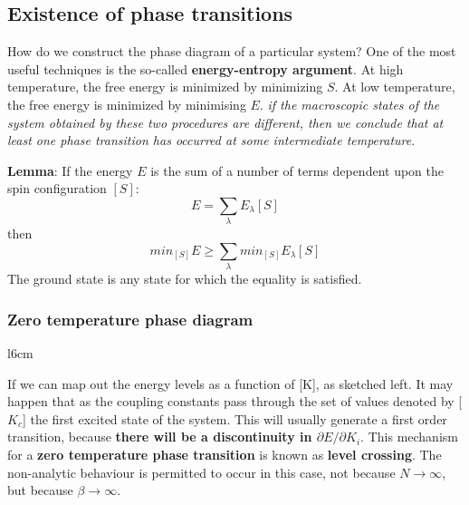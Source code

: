 \documentclass[12pt,titlepage]{article}
\numberwithin{equation}{section}
\begin{document}
\subsection{Existence of phase transitions}
How do we construct the phase diagram of a particular system? One of the most useful techniques is the so-called \textbf{energy-entropy argument}. At high temperature, the free energy is minimized by minimizing $S$. At low temperature, the free energy is minimized by minimising $E$. \textit{if the macroscopic states of the system obtained by these two procedures are different, then we conclude that at least one phase transition has occurred at some intermediate temperature}.

\textbf{Lemma}: If the energy $E$ is the sum of a number of terms dependent upon the spin configuration $[S]$:
\begin{equation}
    E=\sum_{\lambda}E_{\lambda}[S]
\end{equation}
then
\begin{equation}
    min_{[S]}E\geqslant\sum_{\lambda}min_{[S]}E_{\lambda}[S]
\end{equation}
The ground state is any state for which the equality is satisfied.
\subsubsection{Zero temperature phase diagram}
\begin{wrapfigure}{l}{6cm}
\end{wrapfigure}
If we can map out the energy levels as a function of [K], as sketched left. It may happen that as the coupling constants pass through the set of values denoted by [$K_c$] the first excited state of the system. This will usually generate a first order transition, because \textbf{there will be a discontinuity in $\partial E/\partial K_i$}. This mechanism for a \textbf{zero temperature phase transition }is known as \textbf{level crossing}. The non-analytic behaviour is permitted to occur in this case, not because $N\rightarrow\infty$, but because $\beta\rightarrow\infty$.
\end{document}
